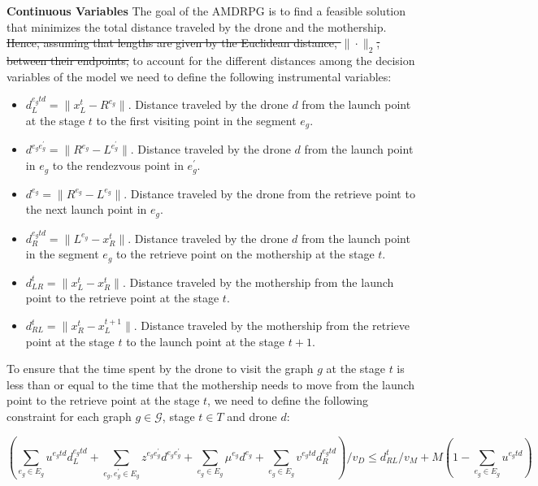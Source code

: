 \documentclass[10pt,a4paper]{article}
\def\AMD{{\sf AMDRPG \xspace }}
\begin{document}
\textbf{Continuous Variables}
  The goal of the \AMD is to find a feasible solution that minimizes the total distance traveled  by the drone and  the mothership. \sout{Hence, assuming that lengths are given by the Euclidean distance, $\|\cdot\|_2$, between their endpoints, }to account for the different distances among the decision variables of the model we need to define the following instrumental variables:
\begin{itemize}
    \item $d_L^{e_gtd} = \|x_L^t - R^{e_g}\|$. Distance traveled by the drone $d$ from the launch point at the stage $t$ to the first visiting point in the segment $e_g$.
    \item $d^{e_ge^\prime_g} = \|R^{e_g} - L^{e^\prime_g}\|$. Distance traveled by the drone $d$ from the launch point in $e_g$ to the rendezvous point in $e^\prime_g$.
    \item $d^{e_g} = \|R^{e_g} - L^{e_g}\|$. Distance traveled by the drone from the retrieve point  to the next launch point in $e_g$.
    \item $d_R^{e_gtd} = \|L^{e_g} - x_R^t\|$. Distance traveled by the drone $d$ from the launch point in the segment $e_g$ to the retrieve point on the mothership at the stage $t$.
    \item $d_{LR}^t = \|x_L^t - x_R^t\|$. Distance traveled by the mothership from the launch point to the retrieve point at the stage $t$.
    \item $d_{RL}^t = \|x_R^t - x_L^{t+1}\|$. Distance traveled by the mothership from the retrieve point at the stage $t$ to the launch point at the stage $t+1$.
\end{itemize}

To ensure that the time spent by the drone to visit the graph $g$ at the stage $t$ is less than or equal to the time that the mothership needs to move from the launch point to the retrieve point at the stage $t$, we need to define the following constraint for each graph $g\in \mathcal G$, stage $t\in T$ and drone $d$:

\begin{equation}\tag{DCW-t}\label{DCW-t}
\left(\sum_{e_g\in E_g} u^{e_gtd}d_L^{e_gtd} + \sum_{e_g, e^\prime_g\in E_g}z^{e_ge^\prime_g}d^{e_ge^\prime_g} + \sum_{e_g\in E_g} \mu^{e_g}d^{e_g} + \sum_{e_g\in E_g} v^{e_gtd}d_R^{e_gtd}\right)/v_D \leq d_{RL}^t/v_M + M(1 - \sum_{e_g\in E_g} u^{e_gtd})
\end{equation}

\end{document}
